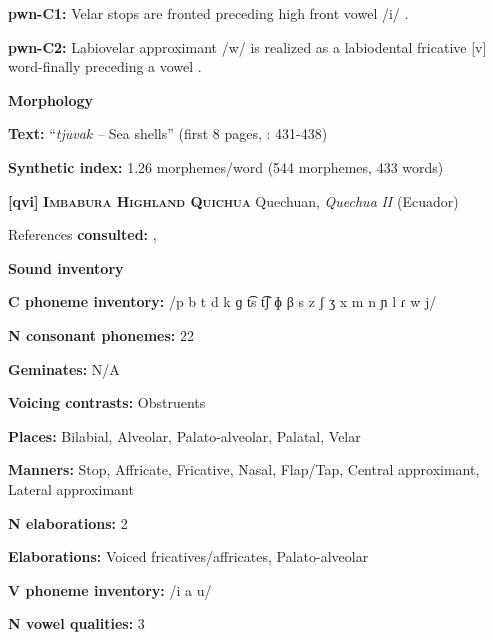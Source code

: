 \textbf{pwn-C1:} Velar stops are fronted preceding high front vowel /i/ \citep[22]{Chang2006}.



\textbf{pwn-C2:} Labiovelar approximant /w/ is realized as a labiodental fricative [v] word-finally preceding a vowel \citep[40]{Chang2006}.



\textbf{Morphology}



\textbf{Text:} “\textit{tjuvak} \textit{--} Sea shells” (first 8 pages, \citealt{Chang2006}: 431-438)



\textbf{Synthetic index:} 1.26 morphemes/word (544 morphemes, 433 words)



\textbf{[qvi]}   \textbf{\textsc{Imbabura Highland Quichua}}    Quechuan, \textit{Quechua} \textit{II} (Ecuador)



References \textbf{consulted:} \citet{Carpenter1982}, \citet{Cole1982}



\textbf{Sound inventory}



\textbf{C phoneme inventory:} /p b t d k ɡ t͡s t͡ʃ ɸ β s z ʃ ʒ x m n ɲ l ɾ w j/



\textbf{N consonant phonemes:} 22



\textbf{Geminates:} N/A



\textbf{Voicing contrasts:} Obstruents



\textbf{Places:} Bilabial, Alveolar, Palato-alveolar, Palatal, Velar



\textbf{Manners:} Stop, Affricate, Fricative, Nasal, Flap/Tap, Central approximant, Lateral approximant



\textbf{N elaborations:} 2



\textbf{Elaborations:} Voiced fricatives/affricates, Palato-alveolar



\textbf{V phoneme inventory:} /i a u/



\textbf{N vowel qualities:} 3



